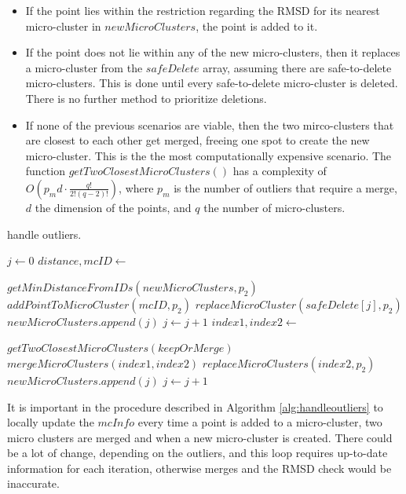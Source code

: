 \documentclass[10pt, conference, compsocconf]{IEEEtran}
\begin{document}
\begin{itemize}
 \item If the point lies within the restriction regarding the RMSD for its nearest micro-cluster in $newMicroClusters$, the point is added to it.
 \item If the point does not lie within any of the new micro-clusters, then it replaces a micro-cluster from the $safeDelete$ array, assuming there are safe-to-delete micro-clusters. This is done until every safe-to-delete micro-cluster is deleted. There is no further method to prioritize deletions.
 \item If none of the previous scenarios are viable, then the two mirco-clusters that are closest to each other get merged, freeing one spot to create the new micro-cluster. This is the the most computationally expensive scenario. The function $getTwoClosestMicroClusters()$ has a complexity of $O(p_{m}d\cdot \frac{q!}{2!(q-2)!})$, where $p_m$ is the number of outliers that require a merge, $d$ the dimension of the points, and $q$ the number of micro-clusters.
\end{itemize}


\begin{algorithm}[h]
 \caption{handle outliers.}\label{alg:handleoutliers}
 \begin{algorithmic}[1]

  \vspace{10pt}
  \State $ j \gets 0$
  \State $distance,mcID \gets $
  \item[] $getMinDistanceFromIDs(newMicroClusters,p_2)$
  \State $addPointToMicroCluster(mcID,p_2)$
  \Else {}
  \State $replaceMicroCluster(safeDelete[j],p_2)$
  \State $newMicroClusters.append(j)$
  \State $j \gets j + 1$
  \Else
  \State $index1,index2 \gets $
  \item[] $getTwoClosestMicroClusters(keepOrMerge)$
  \State $mergeMicroClusters(index1,index2)$
  \State $replaceMicroClusters(index2,p_2)$
  \State $newMicroClusters.append(j)$
  \State $j \gets j + 1$
  \EndIf
  \EndIf
  \EndFor
 \end{algorithmic}
\end{algorithm}

It is important in the procedure described in Algorithm \ref{alg:handleoutliers} to locally update the $mcInfo$ every time a point is added to a micro-cluster, two micro clusters are merged and when a new micro-cluster is created. There could be a lot of change, depending on the outliers, and this loop requires up-to-date information for each iteration, otherwise merges and the RMSD check would be inaccurate.
\end{document}
